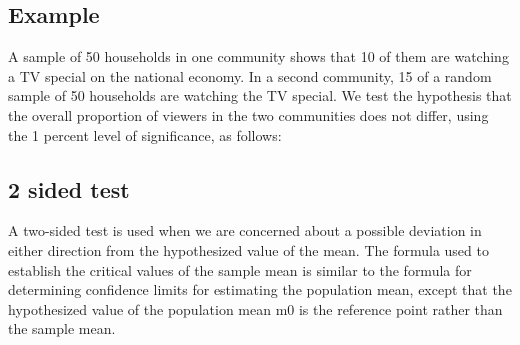 \subsection{Example} A sample of 50 households in one community
shows that 10 of them are watching a TV special on the national
economy. In a second community, 15 of a random sample of 50
households are watching the TV special. We test the hypothesis
that the overall proportion of viewers in the two communities does
not differ, using the 1 percent level of significance, as follows:

\subsection{2 sided test}
A two-sided test is used when we are concerned about a possible
deviation in either direction from the hypothesized value of the
mean. The formula used to establish the critical values of the
sample mean is similar to the formula for determining confidence
limits for estimating the population mean, except that the
hypothesized value of the population mean m0 is the reference
point rather than the sample mean.

